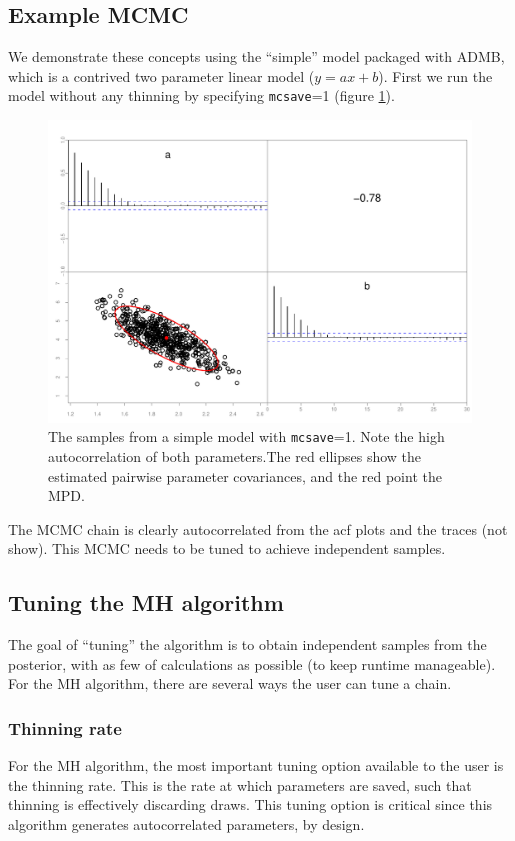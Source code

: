 \documentclass{article}\usepackage[]{graphicx}\usepackage[]{color}
\begin{document}
\subsection{Example MCMC}
We demonstrate these concepts using the ``simple'' model
packaged with ADMB, which is a contrived two parameter
linear model ($y=ax+b$). First we run the model without any
thinning by specifying \texttt{mcsave}=1 (figure
\ref{fig:simple1}).
\begin{figure}[h]
  \centering
  \includegraphics[width=5in]{../plots/simple1.pdf}
  \caption{The samples from a simple model with
    \texttt{mcsave}=1. Note the high autocorrelation of both
    parameters.The red ellipses show the estimated pairwise
    parameter covariances, and the red point the MPD.}
  \label{fig:simple1}
\end{figure}
The MCMC chain is clearly autocorrelated from the acf plots
and the traces (not show). This MCMC needs to be tuned to
achieve independent samples.
\subsection{Tuning the MH algorithm}
The goal of ``tuning'' the algorithm is to obtain
independent samples from the posterior, with as few of
calculations as possible (to keep runtime manageable). For
the MH algorithm, there are several ways the user can tune a chain.

\subsubsection{Thinning rate}
For the MH algorithm, the most important tuning option
available to the user is the thinning rate. This is the rate
at which parameters are saved, such that thinning is
effectively discarding draws. This tuning option is critical
since this algorithm generates autocorrelated parameters, by
design.
\end{document}
